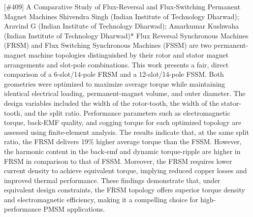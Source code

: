 {} \begin{abstract_online} {[\#409] A Comparative Study of Flux-Reversal and Flux-Switching Permanent Magnet Machines} {} { Shivendra Singh (Indian Institute of Technology Dharwad); Aravind G (Indian Institute of Technology Dharwad); Amarkumar Kushwaha (Indian Institute of Technology Dharwad)*} {} Flux Reversal Synchronous Machines (FRSM) and Flux Switching Synchronous Machines (FSSM) are two permanent-magnet machine topologies distinguished by their rotor and stator magnet arrangements and slot-pole combinations. This work presents a fair, direct comparison of a 6-slot/14-pole FRSM and a 12-slot/14-pole FSSM. Both geometries were optimized to maximize average torque while maintaining identical electrical loading, permanent-magnet volume, and outer diameter. The design variables included the width of the rotor-tooth, the width of the stator-tooth, and the split ratio. Performance parameters such as electromagnetic torque, back-EMF quality, and cogging torque for each optimized topology are assessed using finite-element analysis. The results indicate that, at the same split ratio, the FRSM delivers 19\% higher average torque than the FSSM. However, the harmonic content in the back-emf and dynamic torque-ripple are higher in FRSM in comparison to that of FSSM. Moreover, the FRSM requires lower current density to achieve equivalent torque, implying reduced copper losses and improved thermal performance. These findings demonstrate that, under equivalent design constraints, the FRSM topology offers superior torque density and electromagnetic efficiency, making it a compelling choice for high-performance PMSM applications. \end{abstract_online} 
